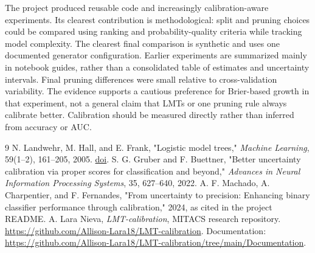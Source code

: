 \documentclass[10pt,twocolumn]{article}
\begin{document}
The project produced reusable code and increasingly calibration-aware experiments. Its clearest contribution is methodological: split and pruning choices could be compared using ranking and probability-quality criteria while tracking model complexity. The clearest final comparison is synthetic and uses one documented generator configuration. Earlier experiments are summarized mainly in notebook guides, rather than a consolidated table of estimates and uncertainty intervals. Final pruning differences were small relative to cross-validation variability. The evidence supports a cautious preference for Brier-based growth in that experiment, not a general claim that LMTs or one pruning rule always calibrate better. Calibration should be measured directly rather than inferred from accuracy or AUC.\begin{thebibliography}{9}
 N. Landwehr, M. Hall, and E. Frank, "Logistic model trees," \emph{Machine Learning}, 59(1--2), 161--205, 2005. \href{https://doi.org/10.1007/s10994-005-0466-3}{doi}.
 S. G. Gruber and F. Buettner, "Better uncertainty calibration via proper scores for classification and beyond," \emph{Advances in Neural Information Processing Systems}, 35, 627--640, 2022.
 A. F. Machado, A. Charpentier, and F. Fernandes, "From uncertainty to precision: Enhancing binary classifier performance through calibration," 2024, as cited in the project README.
 A. Lara Nieva, \emph{LMT-calibration}, MITACS research repository. \url{https://github.com/Allison-Lara18/LMT-calibration}. Documentation: \url{https://github.com/Allison-Lara18/LMT-calibration/tree/main/Documentation}.
\end{thebibliography}
\end{document}
